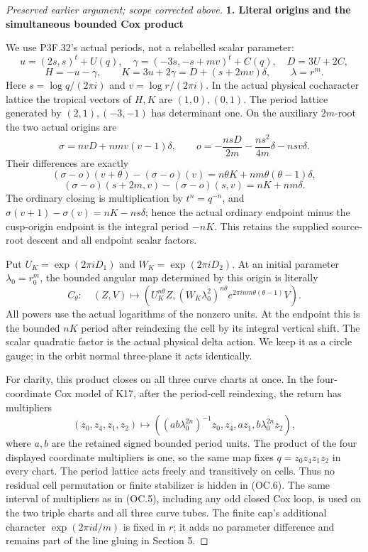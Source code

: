 \begin{proof}[Preserved earlier argument; scope corrected above]
\par

\medskip\noindent\textbf{1. Literal origins and the simultaneous bounded Cox product}

\par\nobreak

We use P3F.32's actual periods, not a relabelled scalar parameter:
\[
 u=(2s,s)^t+U(q),\quad
 \gamma=(-3s,-s+mv)^t+C(q),\quad D=3U+2C,
\]
\[
 H=-u-\gamma,\qquad K=3u+2\gamma=D+(s+2mv)\delta,
 \qquad \lambda=r^m.
 \tag{OC.3}
\]
Here \(s=\log q/(2 \pi i)\) and \(v=\log r/(2 \pi i)\). In the actual physical
cocharacter lattice the tropical vectors of \(H,K\) are \((1,0),(0,1)\).
The period lattice generated by \((2,1),(-3,-1)\) has determinant one.
On the auxiliary \(2m\)-root the two actual origins are
\[
 \sigma=nvD+nmv(v-1)\delta,\qquad
 o=-\frac{nsD}{2m}-\frac{ns^2}{4m}\delta-nsv\delta.
\]
Their differences are exactly
\[
 (\sigma-o)(v+\theta)- (\sigma-o)(v)
       =n\theta K+nm\theta(\theta-1)\delta,
\]
\[
 (\sigma-o)(s+2m,v)- (\sigma-o)(s,v)=nK+nm\delta.
 \tag{OC.4}
\]
The ordinary closing is multiplication by \(t^n=q^{-n}\), and
\(\sigma(v+1)-\sigma(v)=nK-ns \delta\); hence the actual ordinary endpoint
minus the cusp-origin endpoint is the integral period \(-nK\). This
retains the supplied source-root descent and all endpoint scalar factors.

Put \(U_K=\exp(2 \pi i D_1)\) and \(W_K=\exp(2 \pi i D_2)\). At an initial
parameter \(\lambda_0=r_0^m\), the bounded angular map determined by this
origin is literally
\[
 C_\theta:\quad
 (Z,V)\longmapsto
 \left(U_K^{n\theta}Z,
       (W_K\lambda_0^2)^{n\theta}
       e^{2\pi i nm\theta(\theta-1)}V\right).
 \tag{OC.5}
\]
All powers use the actual logarithms of the nonzero units. At the
endpoint this is the bounded \(nK\) period after reindexing the cell by its
integral vertical shift. The scalar quadratic factor is the actual
physical delta action. We keep it as a circle gauge; in the orbit normal
three-plane it acts identically.

For clarity, this product closes on all three curve charts at once.
In the four-coordinate Cox model of K17, after the period-cell reindexing,
the return has multipliers
\[
 (z_0,z_4,z_1,z_2)\longmapsto
 ((ab\lambda_0^{2n})^{-1}z_0,z_4,az_1,
                     b\lambda_0^{2n}z_2),
 \tag{OC.6}
\]
where \(a,b\) are the retained signed bounded period units. The product
of the four displayed coordinate multipliers is one, so the same map fixes \(q=z_0z_4z_1z_2\) in every chart. The
period lattice acts freely and transitively on cells. Thus no residual
cell permutation or finite stabilizer is hidden in (OC.6). The same
interval of multipliers as in (OC.5), including any odd closed Cox loop,
is used on the two triple charts and all three curve tubes. The finite
cap's additional character \(\exp(2 \pi i d/m)\) is fixed in \(r\); it adds no
parameter difference and remains part of the line gluing in Section 5.


\end{proof}
